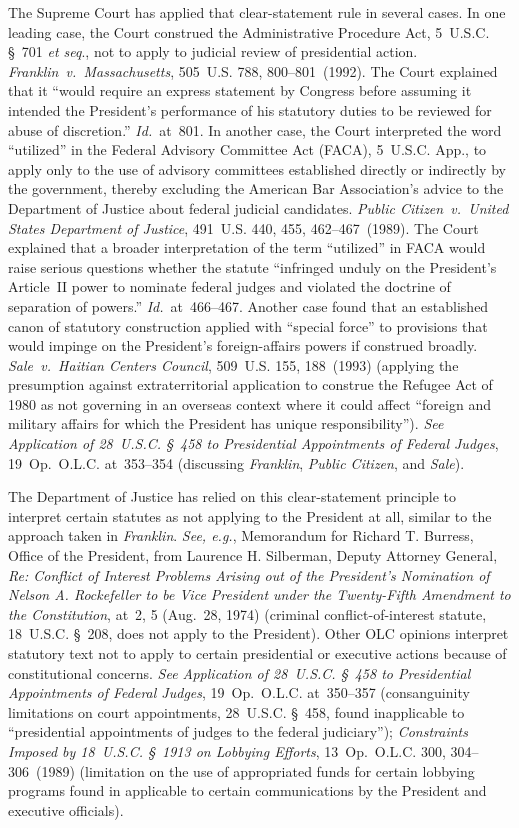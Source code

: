 The Supreme Court has applied that clear-statement rule in several cases.
In one leading case, the Court construed the Administrative Procedure Act, 5~U.S.C. \S~701 \textit{et seq}., not to apply to judicial review of presidential action.
\textit{Franklin~v.\ Massachusetts}, 505~U.S. 788, 800--801~(1992).
The Court explained that it ``would require an express statement by Congress before assuming it intended the President's performance of his statutory duties to be reviewed for abuse of discretion.''
\textit{Id.}~at~801.
In another case, the Court interpreted the word ``utilized'' in the Federal Advisory Committee Act (FACA), 5~U.S.C. App., to apply only to the use of advisory committees established directly or indirectly by the government, thereby excluding the American Bar Association's advice to the Department of Justice about federal judicial candidates.
\textit{Public Citizen~v.\ United States Department of Justice}, 491~U.S. 440, 455, 462--467~(1989).
The Court explained that a broader interpretation of the term ``utilized'' in FACA would raise serious questions whether the statute ``infringed unduly on the President's Article~II power to nominate federal judges and violated the doctrine of separation of powers.''
\textit{Id.}~at~466--467.
Another case found that an established canon of statutory construction applied with ``special force'' to provisions that would impinge on the President's foreign-affairs powers if construed broadly.
\textit{Sale~v.\ Haitian Centers Council}, 509~U.S. 155, 188~(1993) (applying the presumption against extraterritorial application to construe the Refugee Act of 1980 as not governing in an overseas context where it could affect ``foreign and military affairs for which the President has unique responsibility'').
\textit{See Application of 28~U.S.C. \S~458 to Presidential Appointments of Federal Judges}, 19~Op.\ O.L.C. at~353--354 (discussing \textit{Franklin}, \textit{Public Citizen}, and \textit{Sale}).

The Department of Justice has relied on this clear-statement principle to interpret certain statutes as not applying to the President at all, similar to the approach taken in \textit{Franklin}.
\textit{See, e.g.}, Memorandum for Richard T. Burress, Office of the President, from Laurence H. Silberman, Deputy Attorney General, \textit{Re: Conflict of Interest Problems Arising out of the President's Nomination of Nelson A. Rockefeller to be Vice President under the Twenty-Fifth Amendment to the Constitution}, at~2, 5 (Aug.~28, 1974) (criminal conflict-of-interest statute, 18~U.S.C. \S~208, does not apply to the President).
Other OLC opinions interpret statutory text not to apply to certain presidential or executive actions because of constitutional concerns.
\textit{See Application of 28~U.S.C. \S~458 to Presidential Appointments of Federal Judges}, 19~Op.\ O.L.C. at~350--357 (consanguinity limitations on court appointments, 28~U.S.C. \S~458, found inapplicable to ``presidential appointments of judges to the federal judiciary'');
\textit{Constraints Imposed by 18~U.S.C. \S~1913 on Lobbying Efforts}, 13~Op.\ O.L.C. 300, 304--306~(1989) (limitation on the use of appropriated funds for certain lobbying programs found in applicable to certain communications by the President and executive officials).

